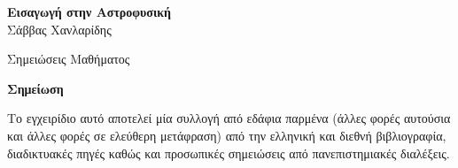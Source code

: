     \begin{titlepage}
        \begingroup
        \thispagestyle{empty}
        \centering
        \vspace*{5cm}
        \par\normalfont\fontsize{35}{35}\sffamily\selectfont
        \textbf{Εισαγωγή στην Αστροφυσική}\\
        {\LARGE Σάββας Χανλαρίδης}\par %
        \vspace*{1cm}
        {\Huge Σημειώσεις Μαθήματος}\par %
        \endgroup
    \end{titlepage}

    \newpage  %
    \mbox{}
    \thispagestyle{empty}
    
    \newpage
    \thispagestyle{empty}
    \begin{center}
        \textbf{\LARGE Σημείωση}
    \end{center}
    \noindent Το εγχειρίδιο αυτό αποτελεί μία συλλογή από εδάφια παρμένα (άλλες φορές αυτούσια και άλλες φορές σε ελεύθερη μετάφραση) από την ελληνική και διεθνή βιβλιογραφία, διαδικτυακές πηγές καθώς και προσωπικές σημειώσεις από πανεπιστημιακές διαλέξεις.
    
